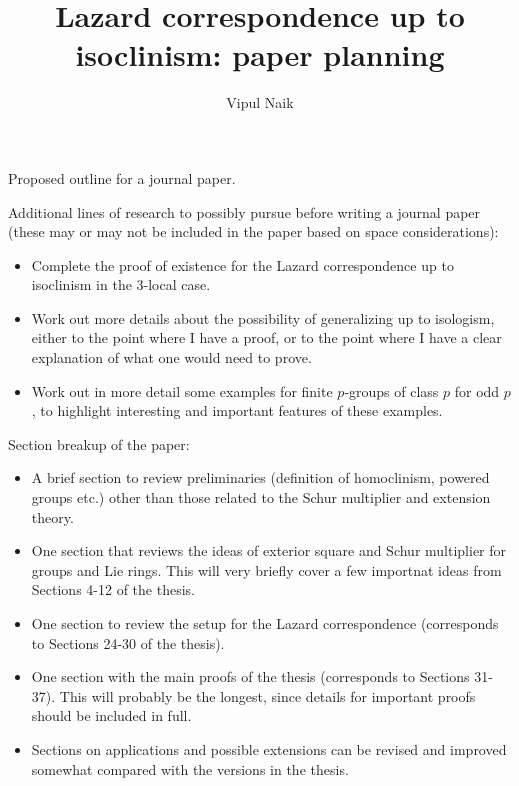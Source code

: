 \documentclass[10pt]{amsart}
\title{Lazard correspondence up to isoclinism: paper planning}
\author{Vipul Naik}
\begin{document}
\maketitle
\onehalfspacing

Proposed outline for a journal paper.

Additional lines of research to possibly pursue before writing a
journal paper (these may or may not be included in the paper based on
space considerations):

\begin{itemize}
\item Complete the proof of existence for the Lazard correspondence up
  to isoclinism in the 3-local case.
\item Work out more details about the possibility of generalizing up
  to isologism, either to the point where I have a proof, or to the
  point where I have a clear explanation of what one would need to prove.
\item Work out in more detail some examples for finite $p$-groups of
  class $p$ for odd $p$, to highlight interesting and important
  features of these examples.
\end{itemize}

Section breakup of the paper:

\begin{itemize}
\item A brief section to review preliminaries (definition of
  homoclinism, powered groups etc.) other than those related to the
  Schur multiplier and extension theory.
\item One section that reviews the ideas of exterior square and Schur
  multiplier for groups and Lie rings. This will very briefly cover a
  few importnat ideas from Sections 4-12 of the thesis.
\item One section to review the setup for the Lazard correspondence
  (corresponds to Sections 24-30 of the thesis).
\item One section with the main proofs of the thesis (corresponds to
  Sections 31-37). This will probably be the longest, since details
  for important proofs should be included in full.
\item Sections on applications and possible extensions can be revised
  and improved somewhat compared with the versions in the thesis.
\end{itemize}
\end{document}
